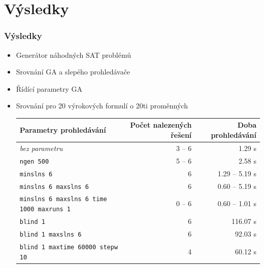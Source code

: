 \documentclass{beamer}
\begin{document}
\section{Výsledky}
\begin{frame}
  \frametitle{Výsledky}
  \begin{itemize}
   \item Generátor náhodných SAT problémů
   \item Srovnání GA a slepého prohledávače
   \item Řídící parametry GA
   \bigskip\item Srovnání pro 20 výrokových formulí o 20ti proměnných
    \begin{table}[h]
    \begin{center}
      \begin{tiny}
      \begin{tabular}{|l|r|r|}\hline
        Parametry prohledávání&Počet nalezených řešení&Doba prohledávání\\\hline
        \textit{bez parametru}&3 -- 6&1.29 s\\
        \texttt{ngen 500}&5 -- 6&2.58 s\\
        \texttt{minslns 6}&6&1.29 -- 5.19 s\\
        \texttt{minslns 6 maxslns 6}&6&0.60 -- 5.19 s\\
        \texttt{minslns 6 maxslns 6 time 1000 maxruns 1}&0 -- 6&0.60 -- 1.01 s\\\hline
        \texttt{blind 1}&6&116.07 s\\
        \texttt{blind 1 maxslns 6}&6&92.03 s\\
        \texttt{blind 1 maxtime 60000 stepw 10}&4&60.12 s\\\hline
      \end{tabular} 
      \end{tiny}
    \end{center}
    \label{tabTime}
    \end{table}
  \end{itemize}
%    
%    

\end{frame}
\end{document}
